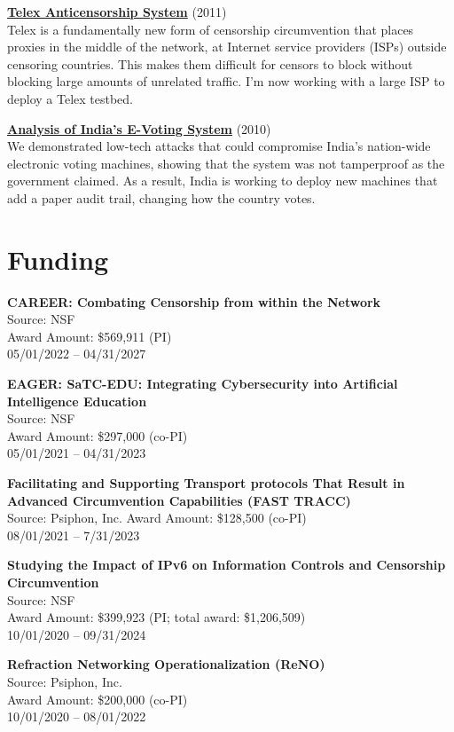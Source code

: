 \documentclass[margin,11pt]{res} %
\begin{document}
\textbf{\href{https://telex.cc/}{Telex Anticensorship System}} (2011)\\
Telex is a fundamentally new form of censorship circumvention that places proxies in the middle of the network, at Internet service providers (ISPs) outside censoring countries.  This makes them difficult for censors to block without blocking large amounts of unrelated traffic. I'm now working with a large ISP to deploy a Telex testbed.

\textbf{\href{http://indiaevm.org/}{Analysis of India's E-Voting System}} (2010)\\
We demonstrated low-tech attacks that could compromise India's nation-wide electronic voting machines, showing that the system was not tamperproof as the government claimed.  As a result, India is working to deploy new machines that add a paper audit trail, changing how the country votes.

\section{\large Funding}


\textbf{CAREER: Combating Censorship from within the Network} \\
Source: NSF \\
Award Amount: \$569,911 (PI) \\
05/01/2022 -- 04/31/2027

\textbf{EAGER: SaTC-EDU: Integrating Cybersecurity into Artificial Intelligence Education} \\
Source: NSF \\
Award Amount: \$297,000 (co-PI) \\
05/01/2021 -- 04/31/2023


\textbf{Facilitating and Supporting Transport protocols That Result in Advanced Circumvention Capabilities (FAST TRACC)} \\
Source: Psiphon, Inc.
Award Amount: \$128,500 (co-PI) \\
08/01/2021 -- 7/31/2023

\textbf{Studying the Impact of IPv6 on Information Controls and Censorship Circumvention} \\
Source: NSF \\
Award Amount: \$399,923 (PI; total award: \$1,206,509) \\
10/01/2020 -- 09/31/2024

\textbf{Refraction Networking Operationalization (ReNO)} \\
Source: Psiphon, Inc. \\
Award Amount: \$200,000 (co-PI) \\
10/01/2020 -- 08/01/2022
\end{document}

